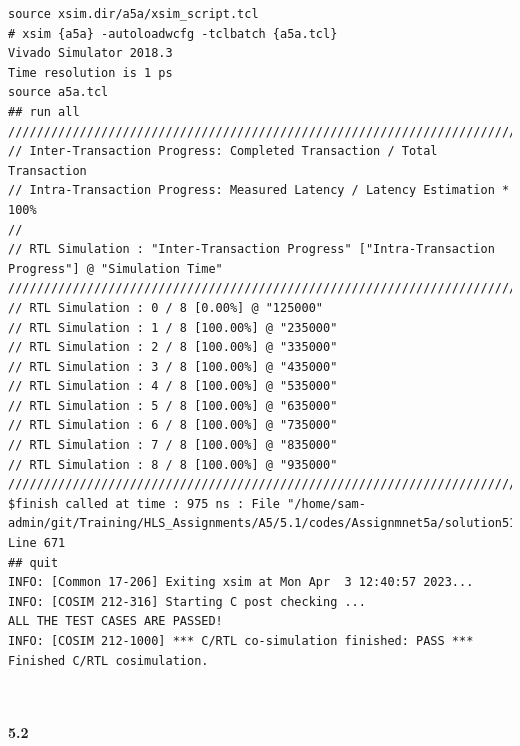 \documentclass{article}
\begin{document}
\begin{lstlisting}
source xsim.dir/a5a/xsim_script.tcl
# xsim {a5a} -autoloadwcfg -tclbatch {a5a.tcl}
Vivado Simulator 2018.3
Time resolution is 1 ps
source a5a.tcl
## run all
////////////////////////////////////////////////////////////////////////////////////
// Inter-Transaction Progress: Completed Transaction / Total Transaction
// Intra-Transaction Progress: Measured Latency / Latency Estimation * 100%
//
// RTL Simulation : "Inter-Transaction Progress" ["Intra-Transaction Progress"] @ "Simulation Time"
////////////////////////////////////////////////////////////////////////////////////
// RTL Simulation : 0 / 8 [0.00%] @ "125000"
// RTL Simulation : 1 / 8 [100.00%] @ "235000"
// RTL Simulation : 2 / 8 [100.00%] @ "335000"
// RTL Simulation : 3 / 8 [100.00%] @ "435000"
// RTL Simulation : 4 / 8 [100.00%] @ "535000"
// RTL Simulation : 5 / 8 [100.00%] @ "635000"
// RTL Simulation : 6 / 8 [100.00%] @ "735000"
// RTL Simulation : 7 / 8 [100.00%] @ "835000"
// RTL Simulation : 8 / 8 [100.00%] @ "935000"
////////////////////////////////////////////////////////////////////////////////////
$finish called at time : 975 ns : File "/home/sam-admin/git/Training/HLS_Assignments/A5/5.1/codes/Assignmnet5a/solution51a/sim/verilog/a5a.autotb.v" Line 671
## quit
INFO: [Common 17-206] Exiting xsim at Mon Apr  3 12:40:57 2023...
INFO: [COSIM 212-316] Starting C post checking ...
ALL THE TEST CASES ARE PASSED!
INFO: [COSIM 212-1000] *** C/RTL co-simulation finished: PASS ***
Finished C/RTL cosimulation.



\end{lstlisting}
\vspace{3cm}
\textbf{5.2}
\vspace{1cm}
\end{document}
